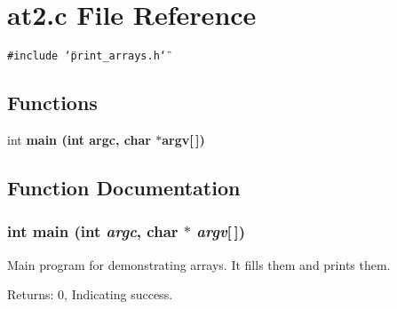 \section{at2.c File Reference}
\label{at2_8c}
{\tt \#include \char`\"{}print\_\-arrays.h\char`\"{}}\par
\subsection*{Functions}
\begin{CompactItemize}
\item 
int \bf{main} (int argc, char $\ast$argv[$\,$])
\end{CompactItemize}


\subsection{Function Documentation}
\subsubsection{\setlength{\rightskip}{0pt plus 5cm}int main (int {\em argc}, char $\ast$ {\em argv}[$\,$])}\label{at2_8c_0ddf1224851353fc92bfbff6f499fa97}


Main program for demonstrating arrays. It fills them and prints them. \begin{Desc}
\item[Returns:]0, Indicating success. \end{Desc}
